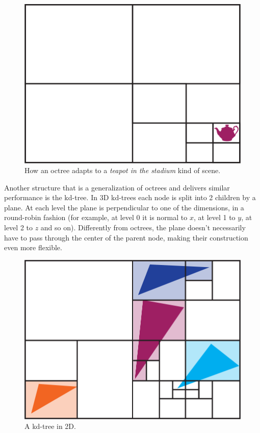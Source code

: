 \documentclass{PoliMi_MasterThesis}
\begin{document}
\begin{figure}[H]
    \centering
    \includegraphics[width=\textwidth*\real{0.45}]{Images/teapot_stadium.png}
    \caption{How an octree adapts to a \textit{teapot in the stadium} kind of scene.}
    \label{fig:octree_teapot_stadium}
\end{figure}

Another structure that is a generalization of octrees and delivers similar performance is the kd-tree. In 3D kd-trees each node is split into 2 children by a plane. At each level the plane is perpendicular to one of the dimensions, in a round-robin fashion (for example, at level 0 it is normal to $x$, at level 1 to $y$, at level 2 to $z$ and so on). Differently from octrees, the plane doesn't necessarily have to pass through the center of the parent node, making their construction even more flexible.

\begin{figure}[H]
    \centering
    \includegraphics[width=\textwidth*\real{0.45}]{Images/kd_tree.png}
    \caption{A kd-tree in 2D.}
    \label{fig:kd_tree}
\end{figure}
\end{document}
